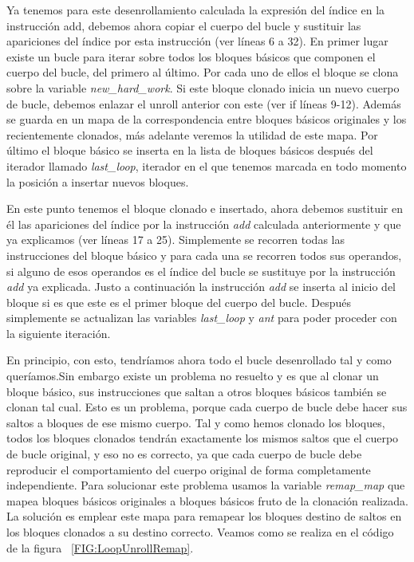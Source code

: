 Ya tenemos para este desenrollamiento calculada la expresión del índice en la instrucción add, debemos ahora copiar el cuerpo del bucle y sustituir las apariciones del índice por esta instrucción (ver líneas 6 a 32). En primer lugar existe un bucle para iterar sobre todos los bloques básicos que componen el cuerpo del bucle, del primero al último. Por cada uno de ellos el bloque se clona sobre la variable \textit{new\_hard\_work}. Si este bloque clonado inicia un nuevo cuerpo de bucle, debemos enlazar el unroll anterior con este (ver if líneas 9-12). Además se guarda en un mapa de la correspondencia entre bloques básicos originales y los recientemente clonados, más adelante veremos la utilidad de este mapa. Por último el bloque básico se inserta en la lista de bloques básicos después del iterador llamado \textit{last\_loop}, iterador en el que tenemos marcada en todo momento la posición a insertar nuevos bloques.

En este punto tenemos el bloque clonado e insertado, ahora debemos sustituir en él las apariciones del índice por la instrucción \textit{add} calculada anteriormente y que ya explicamos  (ver líneas 17 a 25). Simplemente se recorren todas las instrucciones del bloque básico y para cada una se recorren todos sus operandos, si alguno de esos operandos es el índice del bucle se sustituye por la instrucción \textit{add} ya explicada. Justo a continuación la instrucción \textit{add} se inserta al inicio del bloque si es que este es el primer bloque del cuerpo del bucle. Después simplemente se actualizan las variables \textit{last\_loop} y \textit{ant} para poder proceder con la siguiente iteración.

En principio, con esto, tendríamos ahora todo el bucle desenrollado tal y como queríamos.Sin embargo existe un problema no resuelto y es que al clonar un bloque básico, sus instrucciones que saltan a otros bloques básicos también se clonan tal cual. Esto es un problema, porque cada cuerpo de bucle debe hacer sus saltos a bloques de ese mismo cuerpo. Tal y como hemos clonado los bloques, todos los bloques clonados tendrán exactamente los mismos saltos que el cuerpo de bucle original, y eso no es correcto, ya que cada cuerpo de bucle debe reproducir el comportamiento del cuerpo original de forma completamente independiente. Para solucionar este problema usamos la variable \textit{remap\_map} que mapea bloques básicos originales a bloques básicos fruto de la clonación realizada. La solución es emplear este mapa para remapear los bloques destino de saltos en los bloques clonados a su destino correcto. Veamos como se realiza en el código de la figura ~\ref{FIG:LoopUnrollRemap}.

